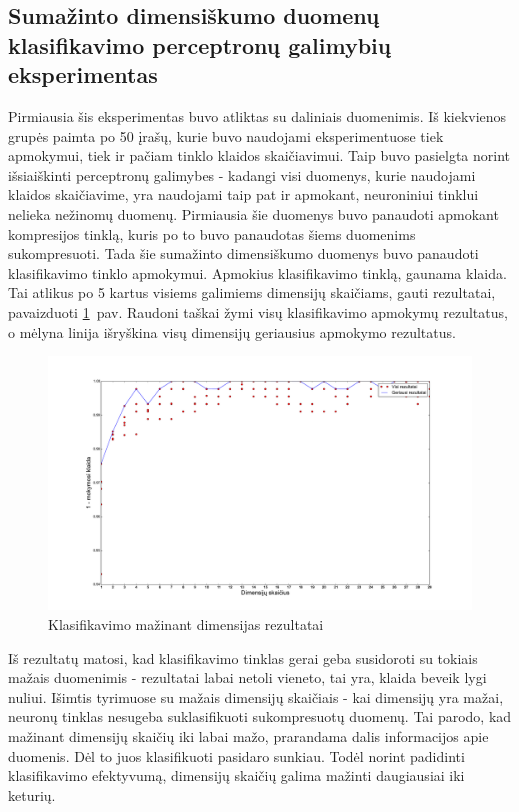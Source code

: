 \documentclass{VUMIFPSbakalaurinis}
\begin{document}
\subsection{Sumažinto dimensiškumo duomenų klasifikavimo perceptronų galimybių eksperimentas}

Pirmiausia šis eksperimentas buvo atliktas su daliniais duomenimis.
Iš kiekvienos grupės paimta po 50 įrašų, kurie buvo naudojami eksperimentuose tiek apmokymui, tiek ir pačiam tinklo klaidos skaičiavimui.
Taip buvo pasielgta norint išsiaiškinti perceptronų galimybes - kadangi visi duomenys, kurie naudojami klaidos skaičiavime, yra naudojami taip pat ir apmokant, neuroniniui tinklui nelieka nežinomų duomenų.
Pirmiausia šie duomenys buvo panaudoti apmokant kompresijos tinklą, kuris po to buvo panaudotas šiems duomenims sukompresuoti.
Tada šie sumažinto dimensiškumo duomenys buvo panaudoti klasifikavimo tinklo apmokymui.
Apmokius klasifikavimo tinklą, gaunama klaida.
Tai atlikus po 5 kartus visiems galimiems dimensijų skaičiams, gauti rezultatai, pavaizduoti \ref{fig:experiment-1}~pav.
Raudoni taškai žymi visų klasifikavimo apmokymų rezultatus, o mėlyna linija išryškina visų dimensijų geriausius apmokymo rezultatus.

\begin{figure}
	\includegraphics[scale=0.32]{pics/dimensions_2015-5-23_15-50-6}
	\caption{Klasifikavimo mažinant dimensijas rezultatai}
	\label{fig:experiment-1}
\end{figure}

Iš rezultatų matosi, kad klasifikavimo tinklas gerai geba susidoroti su tokiais mažais duomenimis - rezultatai labai netoli vieneto, tai yra, klaida beveik lygi nuliui.
Išimtis tyrimuose su mažais dimensijų skaičiais - kai dimensijų yra mažai, neuronų tinklas nesugeba suklasifikuoti sukompresuotų duomenų.
Tai parodo, kad mažinant dimensijų skaičių iki labai mažo, prarandama dalis informacijos apie duomenis.
Dėl to juos klasifikuoti pasidaro sunkiau.
Todėl norint padidinti klasifikavimo efektyvumą, dimensijų skaičių galima mažinti daugiausiai iki keturių.
\end{document}
